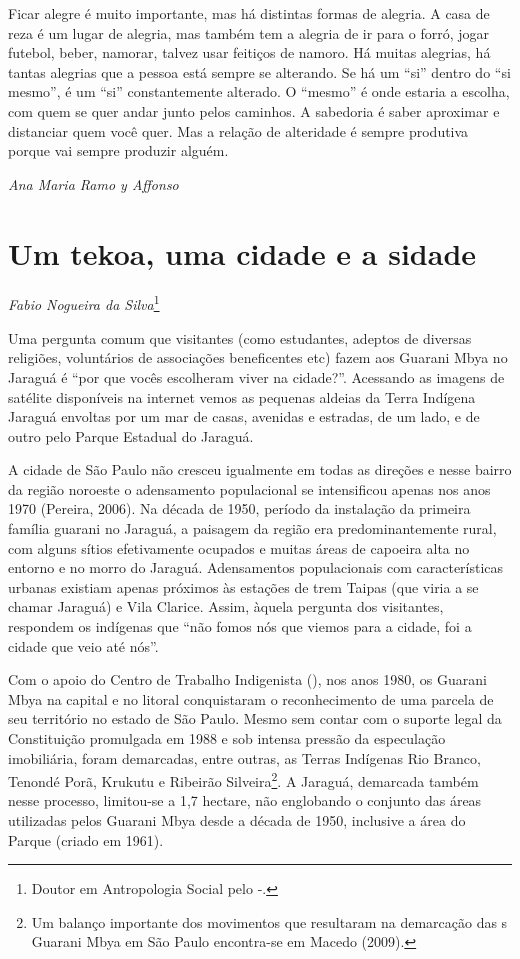Ficar alegre é muito importante, mas há distintas formas de alegria. A
casa de reza é um lugar de alegria, mas também tem a alegria de ir para
o forró, jogar futebol, beber, namorar, talvez usar feitiços de namoro.
Há muitas alegrias, há tantas alegrias que a pessoa está sempre se
alterando. Se há um ``si'' dentro do ``si mesmo'', é um ``si'' constantemente
alterado. O ``mesmo'' é onde estaria a escolha, com quem se quer andar
junto pelos caminhos. A sabedoria é saber aproximar e distanciar quem
você quer. Mas a relação de alteridade é sempre produtiva porque vai
sempre produzir alguém.
\medskip
\begin{flushright}
\emph{Ana Maria Ramo y Affonso}
\end{flushright}

\chapter{Um tekoa, uma cidade e a sidade}
\begin{flushright}
\emph{Fabio Nogueira da Silva}\footnote{Doutor em Antropologia Social pelo
-.}
\end{flushright}
\bigskip

Uma pergunta comum que visitantes (como estudantes, adeptos de diversas
religiões, voluntários de associações beneficentes etc) fazem aos
Guarani Mbya no Jaraguá é ``por que vocês escolheram viver na cidade?''.
Acessando as imagens de satélite disponíveis na internet vemos as
pequenas aldeias da Terra Indígena Jaraguá envoltas por um mar de
casas, avenidas e estradas, de um lado, e de outro pelo Parque Estadual
do Jaraguá. 

A cidade de São Paulo não cresceu igualmente em todas as direções e
nesse bairro da região noroeste o adensamento populacional se
intensificou apenas nos anos 1970 (Pereira, 2006). Na década de 1950,
período da instalação da primeira família guarani no Jaraguá, a
paisagem da região era predominantemente rural, com alguns sítios
efetivamente ocupados e muitas áreas de capoeira alta no entorno e no
morro do Jaraguá. Adensamentos populacionais com características
urbanas existiam apenas próximos às estações de trem Taipas (que viria
a se chamar Jaraguá) e Vila Clarice. Assim, àquela pergunta dos
visitantes, respondem os indígenas que ``não fomos nós que viemos para a
cidade, foi a cidade que veio até nós''. 

Com o apoio do Centro de Trabalho Indigenista (), nos anos 1980, os
Guarani Mbya na capital e no litoral conquistaram o reconhecimento de
uma parcela de seu território no estado de São Paulo. Mesmo sem contar
com o suporte legal da Constituição promulgada em 1988 e sob intensa
pressão da especulação imobiliária, foram demarcadas, entre outras, as
Terras Indígenas Rio Branco, Tenondé Porã, Krukutu e Ribeirão
Silveira\footnote{Um balanço importante dos movimentos que resultaram
na demarcação das s Guarani Mbya em São Paulo encontra-se em Macedo
(2009).}. A  Jaraguá, demarcada também nesse processo, limitou-se a
1,7 hectare, não englobando o conjunto das áreas utilizadas pelos
Guarani Mbya desde a década de 1950, inclusive a área do Parque (criado
em 1961).

